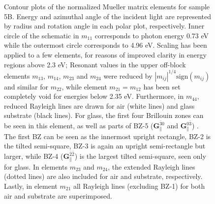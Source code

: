 \begin{figure}
    \caption{Contour plots of the normalized Mueller matrix elements for sample 5B. Energy and azimuthal angle of the incident light are represented by radius and rotation angle in each polar plot, respectively. Inner circle of the schematic in $m_{11}$ corresponds to photon energy 0.73 eV while the outermost circle corresponds to 4.96 eV. Scaling has been applied to a few elements, for reasons of improved clarity in energy regions above 2.3 eV; Resonant values in the upper off-block elements $m_{13}$, $m_{14}$, $m_{23}$ and $m_{24}$ were reduced by $|m_{ij}|^{1/4}\text{sign}(m_{ij})$ and similar for $m_{22}$, while element $m_{21}=m_{12}$ has been set completely void for energies below 2.35 eV. Furthermore, in $m_{44}$, reduced Rayleigh lines are drawn for air (white lines) and glass substrate (black lines). For glass, the first four Brillouin zones can be seen in this element, as well as parts of BZ-5 ($\mathbf{G}_\parallel^{\bar{3}0}$ and $\mathbf{G}_\parallel^{0\bar{3}}$) . The first BZ can be seen as the innermost upright rectangle, BZ-2 is the tilted semi-square, BZ-3 is again an upright semi-rectangle but larger, while BZ-4  ($\mathbf{G}_\parallel^{\bar{2}\bar{2}}$) is the largest tilted semi-square, seen only for glass. In elements $m_{23}$ and $m_{24}$, the extended Rayleigh lines (dotted lines) are also included for air and substrate, respectively. Lastly, in element $m_{21}$ all Rayleigh lines (excluding BZ-1) for both air and substrate are superimposed.} 
    \label{fig:S5B_contour_MM_exp}
\end{figure}

